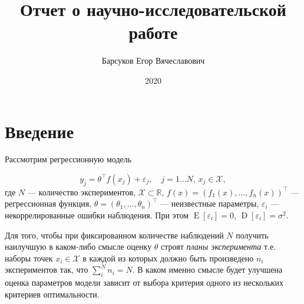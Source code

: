 \documentclass[specialist,
               substylefile = spbu.rtx,
               subf,href,colorlinks=true, 12pt]{disser}
\theoremstyle{definition}
\DeclareMathOperator*{\E}{\mathrm{E}}
\DeclareMathOperator*{\D}{\mathrm{D}}
\begin{document}

\title{Отчет о научно-исследовательской работе}


\author{Барсуков Егор Вячеславович}



\date{2020}

\maketitle

\tableofcontents

\chapter*{Введение}

  Рассмотрим регрессионную модель

  \begin{equation}
  \label{eq:regres}
    y_j = \theta^\top f(x_j) + \varepsilon_j, \quad j = 1 \ldots N, \, x_j \in \mathcal{X},
  \end{equation}
  где $N$ --- количество экспериментов, $\mathcal{X} \subset \mathbb{R}$, $f(x) = \left(f_1(x), \ldots, f_n(x) \right)^\top$ --- регрессионная функция, $\theta = \left( \theta_1, \ldots, \theta_n \right)^\top$ --- неизвестные параметры, $\varepsilon_i$ ---  некоррелированные ошибки наблюдения. При этом $\E [\varepsilon_i] = 0$, $\D [\varepsilon_i] = \sigma^2$.
  
  Для того, чтобы при фиксированном количестве наблюдений $N$ получить наилучшую в каком-либо смысле оценку $\theta$ строят \textit{планы эксперимента} т.е. наборы точек $x_i \in \mathcal{X}$ в каждой из которых должно быть произведено $n_i$ экспериментов так, что $\sum^N_i n_i = N$. В каком именно смысле будет улучшена оценка параметров модели зависит от выбора критерия одного из нескольких критериев оптимальности.
  
\end{document}
